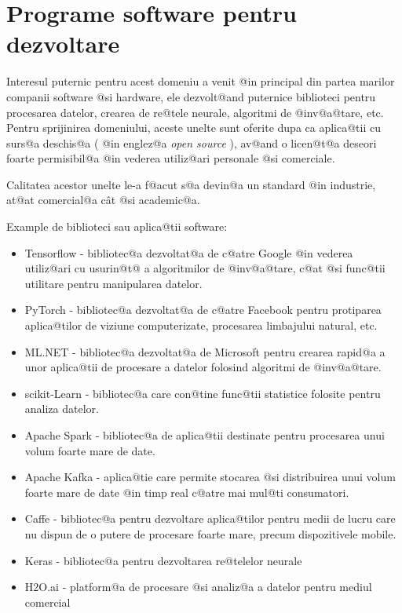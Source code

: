 \section{Programe software pentru dezvoltare}

Interesul puternic pentru acest domeniu a venit @in principal din partea marilor companii software @si hardware, ele dezvolt@and puternice biblioteci pentru procesarea datelor, crearea de re@tele neurale, algoritmi de @inv@a@tare, etc. Pentru sprijinirea domeniului, aceste unelte sunt oferite dupa ca aplica@tii cu surs@a deschis@a ( @in englez@a {\sl open source} ), av@and o licen@t@a deseori foarte permisibil@a @in vederea utiliz@ari personale @si comerciale.

Calitatea acestor unelte le-a f@acut s@a devin@a un standard @in industrie, at@at comercial@a c\^ at @si academic@a.

Example de biblioteci sau aplica@tii software:

\begin{itemize}
	\item Tensorflow - bibliotec@a dezvoltat@a de c@atre Google @in vederea utiliz@ari cu usurin@t@ a algoritmilor de @inv@a@tare, c@at @si func@tii utilitare pentru manipularea datelor.
	\item PyTorch - bibliotec@a dezvoltat@a de c@atre Facebook pentru protiparea aplica@tilor de viziune computerizate, procesarea limbajului natural, etc.
	\item ML.NET - bibliotec@a dezvoltat@a de Microsoft pentru crearea rapid@a a unor aplica@tii de procesare a datelor folosind algoritmi de @inv@a@tare.
	\item scikit-Learn - bibliotec@a care con@tine func@tii statistice folosite pentru analiza datelor.
	\item Apache Spark - bibliotec@a de aplica@tii destinate pentru procesarea unui volum foarte mare de date.
	\item Apache Kafka - aplica@tie care permite stocarea @si distribuirea unui volum foarte mare de date @in timp real c@atre mai mul@ti consumatori.
	\item Caffe - bibliotec@a pentru dezvoltare aplica@tilor pentru medii de lucru care nu dispun de o putere de procesare foarte mare, precum dispozitivele mobile.
	\item Keras - bibliotec@a pentru dezvoltarea re@telelor neurale
	\item H2O.ai - platform@a de procesare @si analiz@a a datelor pentru mediul comercial
	
\end{itemize}

